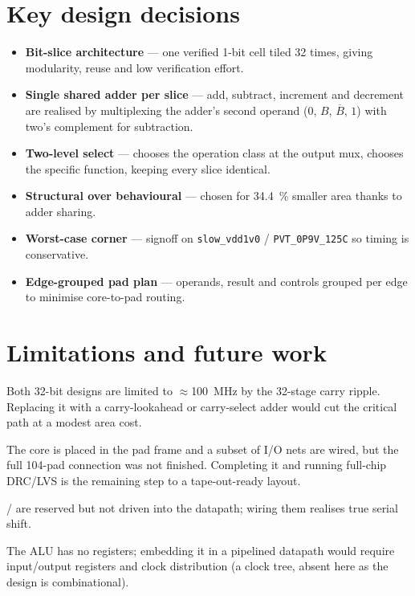 \section{Key design decisions}
\begin{itemize}
  \item \textbf{Bit-slice architecture} --- one verified 1-bit cell tiled
        32 times, giving modularity, reuse and low verification effort.
  \item \textbf{Single shared adder per slice} --- add, subtract,
        increment and decrement are realised by multiplexing the adder's
        second operand ($0$, $B$, $\overline{B}$, $1$) with two's
        complement for subtraction.
  \item \textbf{Two-level select} ---  chooses the operation
        class at the output mux,  chooses the specific
        function, keeping every slice identical.
  \item \textbf{Structural over behavioural} --- chosen for
        \SI{34.4}{\percent} smaller area thanks to adder sharing.
  \item \textbf{Worst-case corner} --- signoff on
        \texttt{slow\_vdd1v0} / \texttt{PVT\_0P9V\_125C} so timing is
        conservative.
  \item \textbf{Edge-grouped pad plan} --- operands, result and controls
        grouped per edge to minimise core-to-pad routing.
\end{itemize}

\section{Limitations and future work}
\begin{description}[leftmargin=1.6em,style=nextline]
  \item[Ripple-carry critical path] Both 32-bit designs are limited to
        $\approx$\SI{100}{\mega\hertz} by the 32-stage carry ripple.
        Replacing it with a carry-lookahead or carry-select adder would
        cut the critical path at a modest area cost.
  \item[Incomplete pad wiring] The core is placed in the pad frame and a
        subset of I/O nets are wired, but the full 104-pad connection was
        not finished. Completing it and running full-chip DRC/LVS is the
        remaining step to a tape-out-ready layout.
  \item[Unconnected shift pads] / are reserved but not
        driven into the datapath; wiring them realises true serial shift.
  \item[Combinational only] The ALU has no registers; embedding it in a
        pipelined datapath would require input/output registers and clock
        distribution (a clock tree, absent here as the design is
        combinational).
\end{description}

